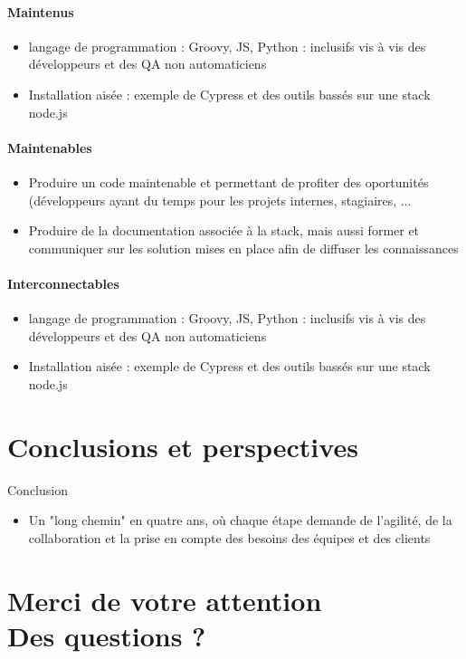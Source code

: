 \begin{frame}{\insertsectionhead}
  \framesubtitle{Maintenus}
    \begin{itemize}
      \item langage de programmation : Groovy, JS, Python : inclusifs vis à vis des développeurs et des QA non automaticiens
      \item Installation aisée : exemple de Cypress et des outils bassés sur une stack node.js
    \end{itemize}
\end{frame}

\begin{frame}{\insertsectionhead}
  \framesubtitle{Maintenables}
    \begin{itemize}
      \item Produire un code maintenable et permettant de profiter des oportunités (développeurs ayant du temps pour les projets internes, stagiaires, ...
      \item Produire de la documentation associée à la stack, mais aussi former et communiquer sur les solution mises en place afin de diffuser les connaissances
    \end{itemize}
\end{frame}

\begin{frame}{\insertsectionhead}
  \framesubtitle{Interconnectables}
    \begin{itemize}
      \item langage de programmation : Groovy, JS, Python : inclusifs vis à vis des développeurs et des QA non automaticiens
      \item Installation aisée : exemple de Cypress et des outils bassés sur une stack node.js
    \end{itemize}
\end{frame}

\section{Conclusions et perspectives}
\begin{frame}{Conclusion}

    \begin{itemize}
      \item Un "long chemin" en quatre ans, où chaque étape demande de l'agilité, de la collaboration et la prise en compte des besoins des équipes et des clients
    \end{itemize}

\end{frame}

\section{Merci de votre attention\\Des questions ?}
